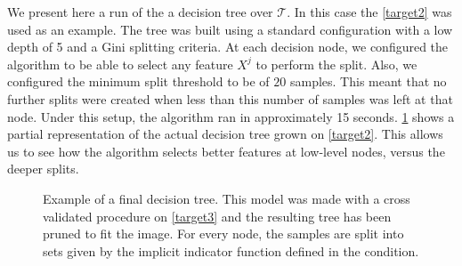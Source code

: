 We present here a run of the a decision tree over $\mathcal{T}$.
In this case the \cref{target2} was used as an example.
The tree was built using a standard configuration with a low depth of 5 and a Gini splitting criteria.
At each decision node, we configured the algorithm to be able to select any feature $X^j$ to perform the split. 
Also, we configured the minimum split threshold to be of $20$ samples.
This meant that no further splits were created when less than this number of samples was left at that node.
Under this setup, the algorithm ran in approximately 15 seconds.
\cref{fig:decision_tree_actual_problem} shows a partial representation of the actual decision tree grown on \cref{target2}.
This allows us to see how the algorithm selects better features at low-level nodes, versus the deeper splits.

\bigskip

\begin{figure}
	\centering
	\caption{ Example of a final decision tree.
		This model was made with a cross validated procedure on \cref{target3} and the resulting tree has been pruned to fit the image.
		For every node, the samples are split into sets given by the implicit indicator function defined in the condition.}
	\label{fig:decision_tree_actual_problem}
\end{figure}




